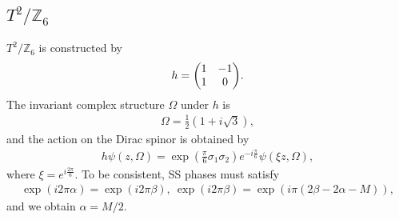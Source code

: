 \documentclass[11pt]{article}
\begin{document}

\subsection{ $T^2/ \mathbb{Z}_6$}
$T^2/ \mathbb{Z}_6$ is constructed by
\begin{align}
    h=\mqty(1 & -1 \\ 1 & 0).
\end{align}
The invariant complex structure $\Omega$ under $h$ is 
\begin{align}
    \Omega= \frac{1}{2}(1+i\sqrt{3}),
\end{align}
and the action on the Dirac spinor is obtained by
\begin{align}
    h\psi(z,\Omega)=\exp(\frac{\pi}{6} \sigma_1 \sigma_2)e^{-i\frac{\pi}{6}} \psi( \xi z,\Omega),
\end{align}
where $\xi= e^{i \frac{2\pi}{6}}$. To be consistent, SS phases must satisfy
\begin{align}
    \exp(i2\pi \alpha)= \exp(i2\pi \beta),~\exp(i2\pi \beta)=\exp(i\pi(2 \beta -2 \alpha-M ) ),
\end{align}
and we obtain $\alpha=M/2$.
\end{document}
